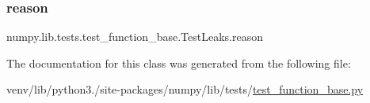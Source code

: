 \subsubsection{\texorpdfstring{reason}{reason}}
{\footnotesize\ttfamily numpy.\+lib.\+tests.\+test\+\_\+function\+\_\+base.\+Test\+Leaks.\+reason\hspace{0.3cm}{\ttfamily [static]}}



The documentation for this class was generated from the following file\+:\begin{DoxyCompactItemize}
\item 
venv/lib/python3./site-\/packages/numpy/lib/tests/\hyperlink{lib_2tests_2test__function__base_8py}{test\+\_\+function\+\_\+base.\+py}\end{DoxyCompactItemize}
